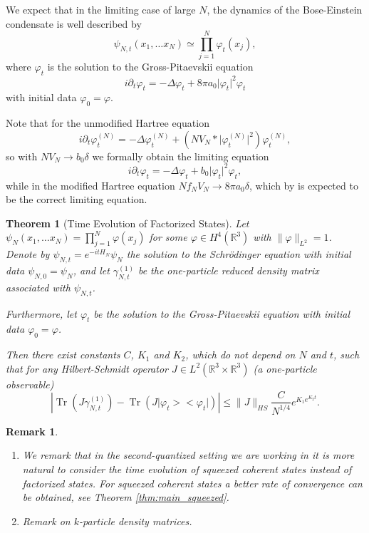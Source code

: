 \documentclass[11pt,a4paper,draft,DIV11]{scrartcl}	%
\newtheorem{thm}{Theorem}[section]
\newtheorem*{rem}{Remark}
\newcommand{\Rbb}{\mathbb{R}}		%
\newcommand{\norm}[1]{\lVert#1\rVert}	%
\newcommand{\ph}{\varphi_t^{(N)}}	%
\newcommand{\project}[1]{\lvert #1 \big>\big< #1\rvert}	%
\newcommand{\Tr}{\operatorname{Tr}}	%
\newcommand{\bd}{\begin{displaymath}}			%
\newcommand{\ed}{\end{displaymath}}
\begin{document}
We expect that in the limiting case of large $N$, the dynamics of the Bose-Einstein condensate is well described by
\bd
\psi_{N,t}(x_1,\ldots x_N) \simeq \prod_{j=1}^N \varphi_t(x_j),
\ed
where $\varphi_t$ is the solution to the Gross-Pitaevskii equation
\bd
i \partial_t \varphi_t = - \Delta \varphi_t + 8\pi a_0 \lvert \varphi_t\rvert^2 \varphi_t
\ed
with initial data $\varphi_0 = \varphi$.

Note that for the unmodified Hartree equation
\[
i \partial_t \ph = -\Delta \ph + \left(N V_N \ast \lvert \ph\rvert^2 \right) \ph,
\]
so with $N V_N \to b_0 \delta$ we formally obtain the limiting equation
\bd
i \partial_t \varphi_t = - \Delta \varphi_t + b_0 \lvert \varphi_t\rvert^2 \varphi_t,
\ed
while in the modified Hartree equation $N f_N V_N \to 8 \pi a_0 \delta$, which by \cite{ESY2010} is expected to be the correct limiting equation.

\begin{thm}[Time Evolution of Factorized States] \label{thm:main_factorized}
 Let $\psi_N(x_1, \ldots x_N) = \prod_{j=1}^N \varphi(x_j)$ for some $\varphi \in H^4(\Rbb^3)$ with $\norm{\varphi}_{L^2} = 1$. Denote by $\psi_{N,t} = e^{-it H_N}\psi_N$ the solution to the Schr\"odinger equation with initial data $\psi_{N,0}= \psi_N$, and let $\gamma_{N,t}^{(1)}$ be the one-particle reduced density matrix associated with $\psi_{N,t}$.

 Furthermore, let $\varphi_t$ be the solution to the Gross-Pitaevskii equation with initial data $\varphi_0 = \varphi$.

 Then there exist constants $C$, $K_1$ and $K_2$, which do not depend on $N$ and $t$, such that for any  Hilbert-Schmidt operator $J \in L^2(\Rbb^3 \times \Rbb^3)$ (a one-particle observable)
\bd
\left\lvert \Tr\left(J \gamma_{N,t}^{(1)} \right) - \Tr\left( J \project{\varphi_t}  \right) \right\rvert \leq \norm{J}_{HS} \frac{C}{N^{1/4}}e^{K_1 e^{K_2 t}}.
\ed
\end{thm}

\begin{rem}
\begin{enumerate}
\item We remark that in the second-quantized setting we are working in it is more natural to consider the time evolution of squeezed coherent states instead of factorized states. For squeezed coherent states a better rate of convergence can be obtained, see Theorem \ref{thm:main_squeezed}.
\item Remark on $k$-particle density matrices.
\end{enumerate}
\end{rem}
\end{document}
